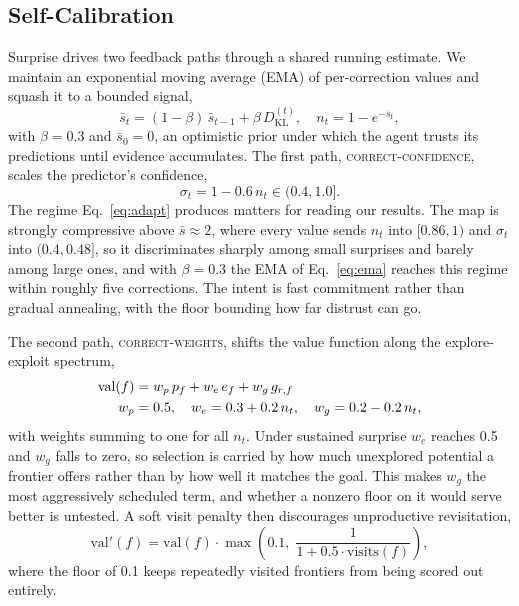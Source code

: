 \subsection{Self-Calibration}
\label{sec:calibration}

Surprise drives two feedback paths through a shared running estimate. We maintain an exponential moving average (EMA) of per-correction values and squash it to a bounded signal,
\begin{equation}
    \bar{s}_t = (1 - \beta)\,\bar{s}_{t-1} + \beta \, D_{\mathrm{KL}}^{(t)}, \quad
    n_t = 1 - e^{-\bar{s}_t} ,
    \label{eq:ema}
\end{equation}
with $\beta = 0.3$ and $\bar{s}_0 = 0$, an optimistic prior under which the agent trusts its predictions until evidence accumulates. The first path, \textsc{correct-confidence}, scales the predictor's confidence,
\begin{equation}
    \sigma_t = 1 - 0.6\, n_t \in (0.4, 1.0] .
    \label{eq:adapt}
\end{equation}
The regime Eq.~\ref{eq:adapt} produces matters for reading our results. The map is strongly compressive above $\bar{s} \approx 2$, where every value sends $n_t$ into $[0.86, 1)$ and $\sigma_t$ into $(0.4, 0.48]$, so it discriminates sharply among small surprises and barely among large ones, and with $\beta = 0.3$ the EMA of Eq.~\ref{eq:ema} reaches this regime within roughly five corrections. The intent is fast commitment rather than gradual annealing, with the floor bounding how far distrust can go.

The second path, \textsc{correct-weights}, shifts the value function along the explore-exploit spectrum,
\begin{align}
    \mathrm{val}(f) &= w_p \, p_f + w_e \, e_f + w_g \, g_{r,f} \label{eq:calibrate} \\
    w_p &= 0.5, \quad w_e = 0.3 + 0.2\,n_t, \quad w_g = 0.2 - 0.2\,n_t , \notag
\end{align}
with weights summing to one for all $n_t$. Under sustained surprise $w_e$ reaches 0.5 and $w_g$ falls to zero, so selection is carried by how much unexplored potential a frontier offers rather than by how well it matches the goal. This makes $w_g$ the most aggressively scheduled term, and whether a nonzero floor on it would serve better is untested. A soft visit penalty then discourages unproductive revisitation,
\begin{equation}
    \mathrm{val}'(f) = \mathrm{val}(f) \cdot \max\!\left(0.1, \; \frac{1}{1 + 0.5 \cdot \mathrm{visits}(f)}\right) ,
    \label{eq:visitpenalty}
\end{equation}
where the floor of 0.1 keeps repeatedly visited frontiers from being scored out entirely.


